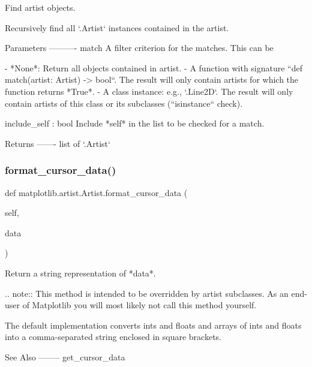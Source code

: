 \begin{DoxyVerb}Find artist objects.

Recursively find all `.Artist` instances contained in the artist.

Parameters
----------
match
    A filter criterion for the matches. This can be

    - *None*: Return all objects contained in artist.
    - A function with signature ``def match(artist: Artist) -> bool``.
      The result will only contain artists for which the function
      returns *True*.
    - A class instance: e.g., `.Line2D`. The result will only contain
      artists of this class or its subclasses (``isinstance`` check).

include_self : bool
    Include *self* in the list to be checked for a match.

Returns
-------
list of `.Artist`\end{DoxyVerb}
 \mbox{\label{classmatplotlib_1_1artist_1_1Artist_a3721e596c8f4044c80a6316721aa5a0b}} 
\subsubsection{\texorpdfstring{format\+\_\+cursor\+\_\+data()}{format\_cursor\_data()}}
{\footnotesize\ttfamily def matplotlib.\+artist.\+Artist.\+format\+\_\+cursor\+\_\+data (\begin{DoxyParamCaption}\item[{}]{self,  }\item[{}]{data }\end{DoxyParamCaption})}

\begin{DoxyVerb}Return a string representation of *data*.

.. note::
    This method is intended to be overridden by artist subclasses.
    As an end-user of Matplotlib you will most likely not call this
    method yourself.

The default implementation converts ints and floats and arrays of ints
and floats into a comma-separated string enclosed in square brackets.

See Also
--------
get_cursor_data
\end{DoxyVerb}
 \mbox{\label{classmatplotlib_1_1artist_1_1Artist_ab61bb9708059e996384165190df83c5d}} 
